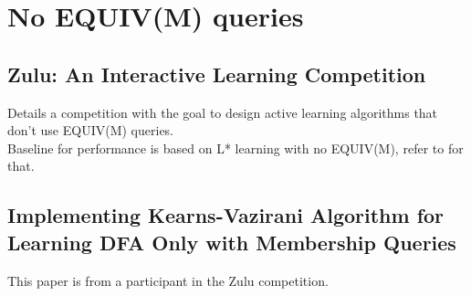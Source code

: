\documentclass[11pt]{article}
\begin{document}
\section{No EQUIV(M) queries}
\subsection{\cite{Combe10} Zulu: An Interactive Learning Competition}
Details a competition with the goal to design active learning algorithms that don't use EQUIV(M) queries. \\
Baseline for performance is based on L* learning with no EQUIV(M), refer to \cite{Angluin87} for that.
\subsection{\cite{Balle10} Implementing Kearns-Vazirani Algorithm for Learning DFA Only with Membership Queries}
This paper is from a participant in the Zulu competition.

{}

\end{document}
